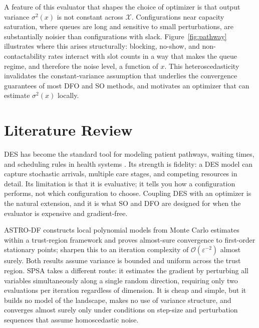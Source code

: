 \documentclass[11pt]{elsarticle}
\begin{document}
A feature of this evaluator that shapes the choice of optimizer is that output variance $\sigma^2(x)$ is not constant across $\mathcal{X}$. Configurations near capacity saturation, where queues are long and sensitive to small perturbations, are substantially noisier than configurations with slack. Figure~\ref{fig:pathway} illustrates where this arises structurally: blocking, no-show, and non-contactability rates interact with slot counts in a way that makes the queue regime, and therefore the noise level, a function of $x$. This heteroscedasticity invalidates the constant-variance assumption that underlies the convergence guarantees of most DFO and SO methods, and motivates an optimizer that can estimate $\sigma^2(x)$ locally.


\section{Literature Review}
\label{sec:litreview}

DES has become the standard tool for modeling patient pathways, waiting times, and scheduling rules in health systems \citep{MonksHarper2025,Law2015}. Its strength is fidelity: a DES model can capture stochastic arrivals, multiple care stages, and competing resources in detail. Its limitation is that it is evaluative; it tells you how a configuration performs, not which configuration to choose. Coupling DES with an optimizer is the natural extension, and it is what SO \citep{Amaran2016} and DFO \citep{Conn2009} are designed for when the evaluator is expensive and gradient-free.

ASTRO-DF \citep{Shashaani2018} constructs local polynomial models from Monte Carlo estimates within a trust-region framework and proves almost-sure convergence to first-order stationary points; \citet{HaShashaani2025} sharpen this to an iteration complexity of $\mathcal{O}(\varepsilon^{-2})$ almost surely. Both results assume variance is bounded and uniform across the trust region. SPSA \citep{Spall1992} takes a different route: it estimates the gradient by perturbing all variables simultaneously along a single random direction, requiring only two evaluations per iteration regardless of dimension. It is cheap and simple, but it builds no model of the landscape, makes no use of variance structure, and converges almost surely only under conditions on step-size and perturbation sequences that assume homoscedastic noise.
\end{document}
